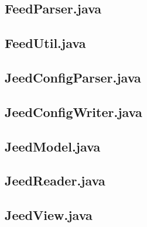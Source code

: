 \documentclass[titlepage, twoside, a4paper, 12pt]{article}
\begin{document}
\subsection{FeedParser.java}\label{FeedParser.java}
\begin{footnotesize}
  
\end{footnotesize}

\newpage
\subsection{FeedUtil.java}\label{FeedUtil.java}
\begin{footnotesize}
  
\end{footnotesize}

\newpage
\subsection{JeedConfigParser.java}\label{JeedConfigParser.java}
\begin{footnotesize}
  
\end{footnotesize}

\newpage
\subsection{JeedConfigWriter.java}\label{JeedConfigWriter.java}
\begin{footnotesize}
  
\end{footnotesize}

\newpage
\subsection{JeedModel.java}\label{JeedModel.java}
\begin{footnotesize}
  
\end{footnotesize}

\newpage
\subsection{JeedReader.java}\label{JeedReader.java}
\begin{footnotesize}
  
\end{footnotesize}

\newpage
\subsection{JeedView.java}\label{JeedView.java}
\begin{footnotesize}
  
\end{footnotesize}
\end{document}
